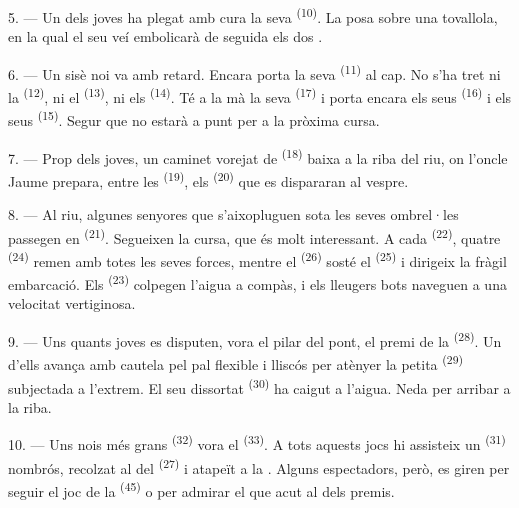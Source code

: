 5. --- Un dels joves ha plegat amb cura la seva 
\textsuperscript{(10)}. La posa sobre una tovallola, en la qual el seu veí
embolicarà de seguida els dos .

6. --- Un sisè noi va amb retard. Encara porta la seva 
\textsuperscript{(11)} al cap. No s'ha tret ni la 
\textsuperscript{(12)}, ni el  \textsuperscript{(13)}, ni els
 \textsuperscript{(14)}. Té a la mà la seva 
\textsuperscript{(17)} i porta encara els seus 
\textsuperscript{(16)} i els seus  \textsuperscript{(15)}. Segur
que no estarà a punt per a la pròxima cursa.

7. --- Prop dels joves, un caminet vorejat de 
\textsuperscript{(18)} baixa a la riba del riu, on l'oncle Jaume prepara, entre
les  \textsuperscript{(19)}, els 
\textsuperscript{(20)} que es dispararan al vespre.

\VUsaut{4.4mm}
\VUsaut{3.4mm}

8. --- Al riu, algunes senyores que s'aixopluguen sota les seves ombrel·les
passegen en  \textsuperscript{(21)}. Segueixen la cursa, que és
molt interessant. A cada  \textsuperscript{(22)}, quatre
 \textsuperscript{(24)} remen amb totes les seves forces, mentre
el  \textsuperscript{(26)} sosté el 
\textsuperscript{(25)} i dirigeix la fràgil embarcació. Els 
\textsuperscript{(23)} colpegen l'aigua a compàs, i els lleugers bots naveguen a
una velocitat vertiginosa.

9. --- Uns quants joves es disputen, vora el pilar del pont, el premi de la
 \textsuperscript{(28)}. Un d'ells avança amb cautela
pel pal flexible i lliscós per atènyer la petita 
\textsuperscript{(29)} subjectada a l'extrem. El seu dissortat
 \textsuperscript{(30)} ha caigut a l'aigua. Neda per arribar
a la riba.

10. --- Uns nois més grans  \textsuperscript{(32)} vora
el  \textsuperscript{(33)}. A tots aquests jocs hi assisteix un
 \textsuperscript{(31)} nombrós, recolzat al  del
 \textsuperscript{(27)} i atapeït a la . Alguns
espectadors, però, es giren per seguir el joc de la 
\textsuperscript{(45)} o per admirar el  que acut al
 dels premis.

